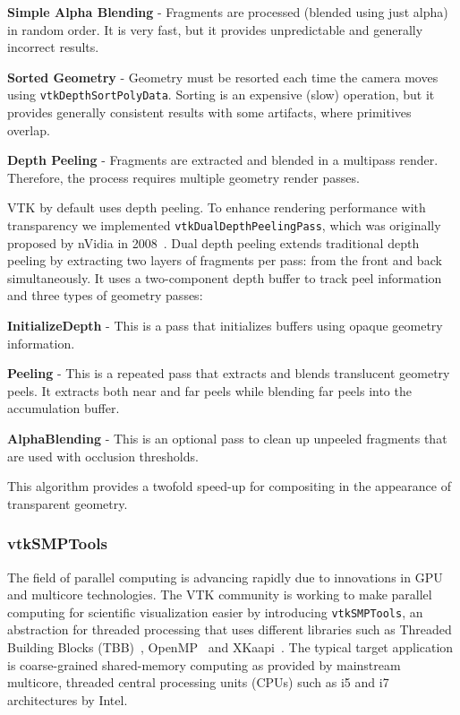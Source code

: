 \begin{compactitem}
\item \textbf{Simple Alpha Blending} - Fragments are processed (blended using just alpha) in random order.
  It is very fast, but it provides unpredictable and generally incorrect results.
\item \textbf{Sorted Geometry} - Geometry must be resorted each time the camera moves using \texttt{vtkDepthSortPolyData}.
  Sorting is an expensive (slow) operation, but it provides generally consistent results with some artifacts, where primitives overlap.
\item \textbf{Depth Peeling} - Fragments are extracted and blended in a multipass render. Therefore, the process requires multiple geometry render passes.
\end{compactitem}

VTK by default uses depth peeling.
To enhance rendering performance with transparency we implemented \texttt{vtkDualDepthPeelingPass}, which was originally proposed by nVidia in 2008~\cite{Bavoil:2008}.
Dual depth peeling extends traditional depth peeling by extracting two layers of fragments per pass: from the front and back simultaneously.
It uses a two-component depth buffer to track peel information and three types of geometry passes:

\begin{compactitem}
\item \textbf{InitializeDepth} - This is a pass that initializes buffers using opaque geometry information.
\item \textbf{Peeling} - This is a repeated pass that extracts and blends translucent geometry peels. It extracts both near and far peels while blending far peels into the accumulation buffer.
\item \textbf{AlphaBlending} - This is an optional pass to clean up unpeeled fragments that are used with occlusion thresholds.
\end{compactitem}

This algorithm provides a twofold speed-up for compositing in the appearance of transparent geometry.

\subsubsection{vtkSMPTools}

The field of parallel computing is advancing rapidly due to innovations in GPU and multicore technologies.
The VTK community is working to make parallel computing for scientific visualization easier by introducing \texttt{vtkSMPTools}, an abstraction for threaded processing that uses different libraries such as Threaded Building Blocks (TBB)~\cite{TBB:2016}, OpenMP~\cite{OpenMP:2016} and XKaapi~\cite{Gautier:2013}.
The typical target application is coarse-grained shared-memory computing as provided by mainstream multicore, threaded central processing units (CPUs) such as i5 and i7 architectures by Intel.

